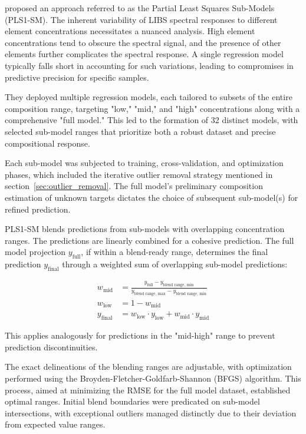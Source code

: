 \citet{andersonImprovedAccuracyQuantitative2017} proposed an approach referred to as the Partial Least Squares Sub-Models (PLS1-SM).
The inherent variability of LIBS spectral responses to different element concentrations necessitates a nuanced analysis. High element concentrations tend to obscure the spectral signal, and the presence of other elements further complicates the spectral response. A single regression model typically falls short in accounting for such variations, leading to compromises in predictive precision for specific samples.

They deployed multiple regression models, each tailored to subsets of the entire composition range, targeting "low," "mid," and "high" concentrations along with a comprehensive "full model." This led to the formation of 32 distinct models, with selected sub-model ranges that prioritize both a robust dataset and precise compositional response.

Each sub-model was subjected to training, cross-validation, and optimization phases, which included the iterative outlier removal strategy mentioned in section~\ref{sec:outlier_removal}. The full model's preliminary composition estimation of unknown targets dictates the choice of subsequent sub-model(s) for refined prediction.

PLS1-SM blends predictions from sub-models with overlapping concentration ranges. The predictions are linearly combined for a cohesive prediction. The full model projection $y_{\text{full}}$, if within a blend-ready range, determines the final prediction $y_{\text{final}}$ through a weighted sum of overlapping sub-model predictions:

\begin{align*}
w_{\text{mid}} &= \frac{y_{\text{full}}-y_{\text{blend range, min}}}{y_{\text{blend range, max}} - y_{\text{blend range, min}}} \\
w_{\text{low}} &= 1 - w_{\text{mid}} \\
y_{\text{final}} &= w_{\text{low}}\cdot y_{\text{low}} + w_{\text{mid}}\cdot y_{\text{mid}} 
\end{align*}

This applies analogously for predictions in the "mid-high" range to prevent prediction discontinuities.

The exact delineations of the blending ranges are adjustable, with optimization performed using the Broyden-Fletcher-Goldfarb-Shannon (BFGS) algorithm. This process, aimed at minimizing the RMSE for the full model dataset, established optimal ranges. Initial blend boundaries were predicated on sub-model intersections, with exceptional outliers managed distinctly due to their deviation from expected value ranges.

